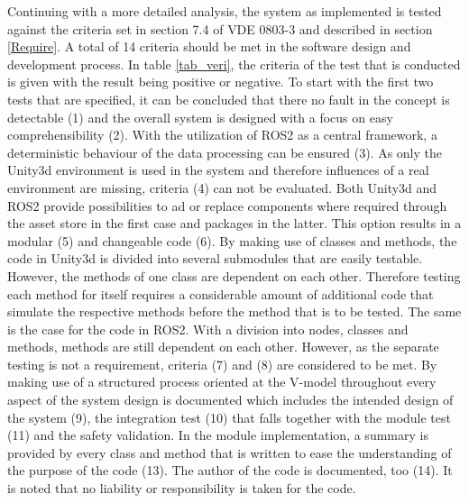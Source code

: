 	Continuing with a more detailed analysis, the system as implemented is tested against the criteria set in section 7.4 of \ac{VDE} 0803-3 \cite{DIN_3} and described in section \ref{Require}. A total of 14 criteria should be met in the software design and development process. In table \ref{tab_veri}, the criteria of the test that is conducted is given with the result being positive or negative. To start with the first two tests that are specified, it can be concluded that there no fault in the concept is detectable (1) and the overall system is designed with a focus on easy comprehensibility (2). With the utilization of \ac{ROS2} as a central framework, a deterministic behaviour of the data processing can be ensured (3). As only the Unity3d environment is used in the system and therefore influences of a real environment are missing, criteria (4) can not be evaluated. Both Unity3d and \ac{ROS2} provide possibilities to ad or replace components where required through the asset store in the first case and packages in the latter. This option results in a modular (5) and changeable code (6). By making use of classes and methods, the code in Unity3d is divided into several submodules that are easily testable. However, the methods of one class are dependent on each other. Therefore testing each method for itself requires a considerable amount of additional code that simulate the respective methods before the method that is to be tested. The same is the case for the code in \ac{ROS2}. With a division into nodes, classes and methods, methods are still dependent on each other. However, as the separate testing is not a requirement, criteria (7) and (8) are considered to be met. By making use of a structured process oriented at the V-model throughout every aspect of the system design is  documented which includes the intended design of the system (9), the integration test (10) that falls together with the module test (11) and the safety validation. In the module implementation, a summary is provided by every class and method that is written to ease the understanding of the purpose of the code (13). The author of the code is documented, too (14). It is noted that no liability or responsibility is taken for the code.\\
	
	

